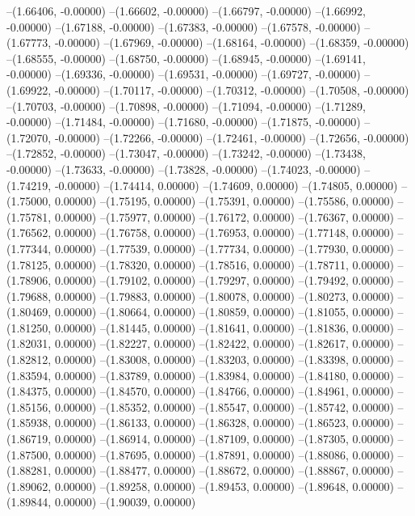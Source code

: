--(1.66406, -0.00000)
--(1.66602, -0.00000)
--(1.66797, -0.00000)
--(1.66992, -0.00000)
--(1.67188, -0.00000)
--(1.67383, -0.00000)
--(1.67578, -0.00000)
--(1.67773, -0.00000)
--(1.67969, -0.00000)
--(1.68164, -0.00000)
--(1.68359, -0.00000)
--(1.68555, -0.00000)
--(1.68750, -0.00000)
--(1.68945, -0.00000)
--(1.69141, -0.00000)
--(1.69336, -0.00000)
--(1.69531, -0.00000)
--(1.69727, -0.00000)
--(1.69922, -0.00000)
--(1.70117, -0.00000)
--(1.70312, -0.00000)
--(1.70508, -0.00000)
--(1.70703, -0.00000)
--(1.70898, -0.00000)
--(1.71094, -0.00000)
--(1.71289, -0.00000)
--(1.71484, -0.00000)
--(1.71680, -0.00000)
--(1.71875, -0.00000)
--(1.72070, -0.00000)
--(1.72266, -0.00000)
--(1.72461, -0.00000)
--(1.72656, -0.00000)
--(1.72852, -0.00000)
--(1.73047, -0.00000)
--(1.73242, -0.00000)
--(1.73438, -0.00000)
--(1.73633, -0.00000)
--(1.73828, -0.00000)
--(1.74023, -0.00000)
--(1.74219, -0.00000)
--(1.74414, 0.00000)
--(1.74609, 0.00000)
--(1.74805, 0.00000)
--(1.75000, 0.00000)
--(1.75195, 0.00000)
--(1.75391, 0.00000)
--(1.75586, 0.00000)
--(1.75781, 0.00000)
--(1.75977, 0.00000)
--(1.76172, 0.00000)
--(1.76367, 0.00000)
--(1.76562, 0.00000)
--(1.76758, 0.00000)
--(1.76953, 0.00000)
--(1.77148, 0.00000)
--(1.77344, 0.00000)
--(1.77539, 0.00000)
--(1.77734, 0.00000)
--(1.77930, 0.00000)
--(1.78125, 0.00000)
--(1.78320, 0.00000)
--(1.78516, 0.00000)
--(1.78711, 0.00000)
--(1.78906, 0.00000)
--(1.79102, 0.00000)
--(1.79297, 0.00000)
--(1.79492, 0.00000)
--(1.79688, 0.00000)
--(1.79883, 0.00000)
--(1.80078, 0.00000)
--(1.80273, 0.00000)
--(1.80469, 0.00000)
--(1.80664, 0.00000)
--(1.80859, 0.00000)
--(1.81055, 0.00000)
--(1.81250, 0.00000)
--(1.81445, 0.00000)
--(1.81641, 0.00000)
--(1.81836, 0.00000)
--(1.82031, 0.00000)
--(1.82227, 0.00000)
--(1.82422, 0.00000)
--(1.82617, 0.00000)
--(1.82812, 0.00000)
--(1.83008, 0.00000)
--(1.83203, 0.00000)
--(1.83398, 0.00000)
--(1.83594, 0.00000)
--(1.83789, 0.00000)
--(1.83984, 0.00000)
--(1.84180, 0.00000)
--(1.84375, 0.00000)
--(1.84570, 0.00000)
--(1.84766, 0.00000)
--(1.84961, 0.00000)
--(1.85156, 0.00000)
--(1.85352, 0.00000)
--(1.85547, 0.00000)
--(1.85742, 0.00000)
--(1.85938, 0.00000)
--(1.86133, 0.00000)
--(1.86328, 0.00000)
--(1.86523, 0.00000)
--(1.86719, 0.00000)
--(1.86914, 0.00000)
--(1.87109, 0.00000)
--(1.87305, 0.00000)
--(1.87500, 0.00000)
--(1.87695, 0.00000)
--(1.87891, 0.00000)
--(1.88086, 0.00000)
--(1.88281, 0.00000)
--(1.88477, 0.00000)
--(1.88672, 0.00000)
--(1.88867, 0.00000)
--(1.89062, 0.00000)
--(1.89258, 0.00000)
--(1.89453, 0.00000)
--(1.89648, 0.00000)
--(1.89844, 0.00000)
--(1.90039, 0.00000)
